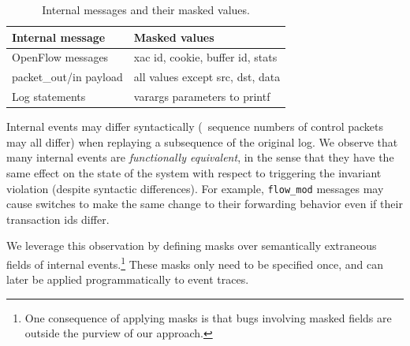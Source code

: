 

\begin{table}[tb]
\centering
\footnotesize
\begin{tabular}{|l|l|}
\hline
{\bf Internal message} & {\bf Masked values} \\
\hline
\hline
OpenFlow messages & xac id, cookie, buffer id, stats \\
\hline
packet\_out/in payload & all values except src, dst, data \\
\hline
Log statements & varargs parameters to printf \\
\hline
\end{tabular}
\caption{Internal messages and their masked values. %
}
\label{tab:fingerprints}
\vspace{-0.5cm}
\end{table}

 Internal events may differ syntactically (\eg~sequence numbers
of control packets may all differ) when replaying a subsequence of the original log.
We observe that many internal events are {\em functionally
equivalent}, in the sense that they
have the same effect on the state of the system with respect to triggering the
invariant violation (despite syntactic differences). For example,
\verb=flow_mod=
messages may cause switches to make the same change to their forwarding behavior
even if their transaction ids differ.

We leverage this observation by defining
masks over semantically extraneous fields of
internal events.\footnote{One consequence
of applying masks is that bugs involving masked fields are outside the purview of
our approach.} These masks only need to be specified once, and can later be
applied programmatically to event traces.

